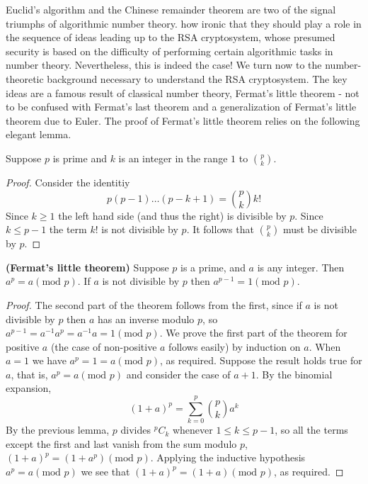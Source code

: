 Euclid's algorithm and the Chinese remainder theorem are two of the signal triumphs of algorithmic number theory. how ironic that they should play a role in the sequence of ideas leading up to the RSA cryptosystem, whose presumed security is based on the difficulty of performing certain algorithmic tasks in number theory. Nevertheless, this is indeed the case! We turn now to the number-theoretic background necessary to understand the RSA cryptosystem. The key ideas are a famous result of classical number theory, Fermat's little theorem - not to be confused with Fermat's last theorem and a generalization of Fermat's little theorem due to Euler. The proof of Fermat's little theorem relies on the following elegant lemma.

\begin{lemma}
    Suppose $p$ is prime and $k$ is an integer in the range $1$ to $\binom{p}{k}$.
\end{lemma}
\begin{proof}
    Consider the identitiy
    \[
    p(p-1)\ldots (p-k+1) = \binom{p}{k} k!
    \]
    Since $k \geq 1$ the left hand side (and thus the right) is divisible by $p$. Since $k\leq p-1$ the term $k!$ is not divisible by $p$. It follows that $\binom{p}{k}$ must be divisible by $p$.
\end{proof}

\begin{theorem}
    \textbf{(Fermat's little theorem)} Suppose $p$ is a prime, and $a$ is any integer. Then $a^p = a (\text{mod }p)$. If $a$ is not divisible by $p$ then $a^{p-1} = 1 (\text{mod }p)$.
\end{theorem}
\begin{proof}
    The second part of the theorem follows from the first, since if $a$ is not divisible by $p$ then $a$ has an inverse modulo $p$, so $a^{p-1}=a^{-1}a^p = a^{-1}a =1 (\text{mod }p)$. We prove the first part of the theorem for positive $a$ (the case of non-positive $a$ follows easily) by induction on $a$. When $a=1$ we have $a^p=1=a(\text{mod }p)$, as required. Suppose the result holds true for $a$, that is, $a^p=a(\text{mod }p)$ and consider the case of $a+1$. By the binomial expansion,
    \[
    (1+a)^p = \sum_{k=0}^p \binom{p}{k} a^k
    \]
    By the previous lemma, $p$ divides $^pC_k$ whenever $1\leq k \leq p-1$, so all the terms except the first and last vanish from the sum modulo $p$, $(1+a)^p = (1+a^p) (\text{mod }p)$. Applying the inductive hypothesis $a^p =a (\text{mod }p)$ we see that $(1+a)^p = (1+a) (\text{mod }p)$, as required.
\end{proof}

